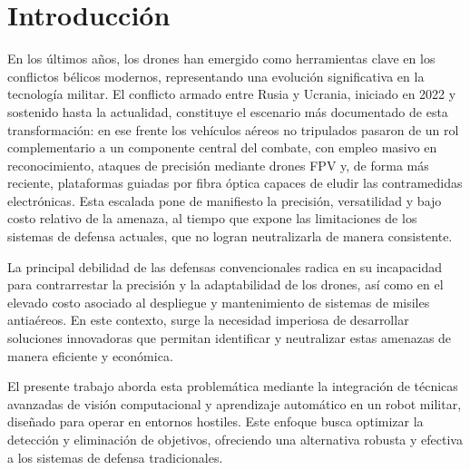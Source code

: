 \section{Introducción}
\label{Introduccion}

En los últimos años, los drones han emergido como herramientas clave en los conflictos bélicos modernos, representando una evolución significativa en la tecnología militar. El conflicto armado entre Rusia y Ucrania, iniciado en 2022 y sostenido hasta la actualidad, constituye el escenario más documentado de esta transformación: en ese frente los vehículos aéreos no tripulados pasaron de un rol complementario a un componente central del combate, con empleo masivo en reconocimiento, ataques de precisión mediante drones FPV y, de forma más reciente, plataformas guiadas por fibra óptica capaces de eludir las contramedidas electrónicas. Esta escalada pone de manifiesto la precisión, versatilidad y bajo costo relativo de la amenaza, al tiempo que expone las limitaciones de los sistemas de defensa actuales, que no logran neutralizarla de manera consistente.

La principal debilidad de las defensas convencionales radica en su incapacidad para contrarrestar la precisión y la adaptabilidad de los drones, así como en el elevado costo asociado al despliegue y mantenimiento de sistemas de misiles antiaéreos. En este contexto, surge la necesidad imperiosa de desarrollar soluciones innovadoras que permitan identificar y neutralizar estas amenazas de manera eficiente y económica. 

El presente trabajo aborda esta problemática mediante la integración de técnicas avanzadas de visión computacional y aprendizaje automático en un robot militar, diseñado para operar en entornos hostiles. Este enfoque busca optimizar la detección y eliminación de objetivos, ofreciendo una alternativa robusta y efectiva a los sistemas de defensa tradicionales.


